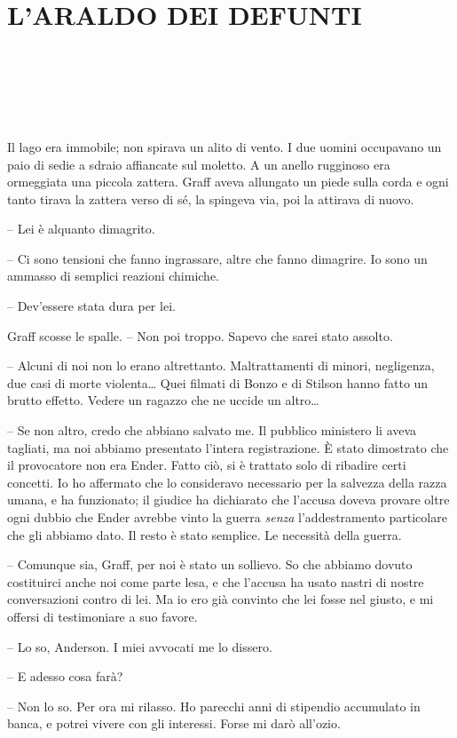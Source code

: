 \chapter{L'ARALDO DEI DEFUNTI}

{~}

{~}

{~}

{Il lago era immobile; non spirava un alito di vento. I due uomini
	occupavano un paio di sedie a sdraio affiancate sul moletto. A un anello
	rugginoso era ormeggiata una piccola zattera. Graff aveva allungato un
	piede sulla corda e ogni tanto tirava la zattera verso di sé, la
	spingeva via, poi la attirava di nuovo.}

{-- Lei è alquanto dimagrito.}

{-- Ci sono tensioni che fanno ingrassare, altre che fanno dimagrire. Io
	sono un ammasso di semplici reazioni chimiche.}

{-- Dev'essere stata dura per lei.}

{Graff scosse le spalle. -- Non poi troppo. Sapevo che sarei stato
	assolto.}

{-- Alcuni di noi non lo erano altrettanto. Maltrattamenti di minori,
	negligenza, due casi di morte violenta\ldots{} Quei filmati di Bonzo e
	di Stilson hanno fatto un brutto effetto. Vedere un ragazzo che ne
	uccide un altro\ldots{}}

{-- Se non altro, credo che abbiano salvato me. Il pubblico ministero li
	aveva tagliati, ma noi abbiamo presentato l'intera registrazione. È
	stato dimostrato che il provocatore non era Ender. Fatto ciò, si è
	trattato solo di ribadire certi concetti. Io ho affermato che lo
	consideravo necessario per la salvezza della razza umana, e ha
	funzionato; il giudice ha dichiarato che l'accusa doveva provare oltre
	ogni dubbio che Ender avrebbe vinto la guerra \emph{senza}
	l'addestramento particolare che gli abbiamo dato. Il resto è stato
	semplice. Le necessità della guerra.}

{-- Comunque sia, Graff, per noi è stato un sollievo. So che abbiamo
	dovuto costituirci anche noi come parte lesa, e che l'accusa ha usato
	nastri di nostre conversazioni contro di lei. Ma io ero già convinto che
	lei fosse nel giusto, e mi offersi di testimoniare a suo favore.}

{-- Lo so, Anderson. I miei avvocati me lo dissero.}

{-- E adesso cosa farà?}

{-- Non lo so. Per ora mi rilasso. Ho parecchi anni di stipendio
	accumulato in banca, e potrei vivere con gli interessi. Forse mi darò
	all'ozio.}

